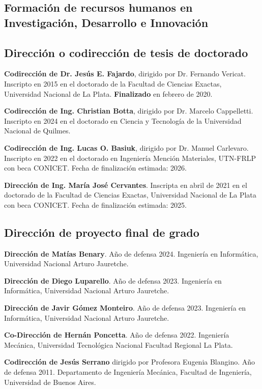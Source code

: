 \documentclass[margin,line]{res}
\begin{document}
\begin{resume}
\section{ Formación de recursos humanos en Investigación, Desarrollo e Innovación}
\vspace*{-.2in}
\subsection{ Dirección o codirección de tesis de doctorado}

{\bf Codirección de Dr. Jesús E. Fajardo}, dirigido por Dr. Fernando Vericat. Inscripto en 2015 en el doctorado de la Facultad de Ciencias Exactas, Universidad Nacional de La Plata. {\bf Finalizado} en febrero de 2020.

{\bf Codirección de Ing. Christian Botta}, dirigido por Dr. Marcelo Cappelletti. Inscripto en 2024 en el doctorado en Ciencia y Tecnología de la Universidad Nacional de Quilmes.

{\bf Codirección de Ing. Lucas O. Basiuk}, dirigido por Dr. Manuel Carlevaro. Inscripto en 2022 en el doctorado en Ingeniería Mención Materiales, UTN-FRLP con beca CONICET. Fecha de finalización estimada: 2026.

{\bf Dirección de Ing. María José Cervantes}. Inscripta en abril de 2021 en el doctorado de la Facultad de Ciencias Exactas, Universidad Nacional de La Plata con beca CONICET. Fecha de finalización estimada: 2025.

\subsection{ Dirección de proyecto final de grado}

{\bf Dirección de Matías Benary}. Año de defensa 2024. Ingeniería en Informática, Universidad Nacional Arturo Jauretche.

{\bf Dirección de Diego Luparello}. Año de defensa 2023. Ingeniería en Informática, Universidad Nacional Arturo Jauretche.

{\bf Dirección de Javir Gómez Monteiro}. Año de defensa 2023. Ingeniería en Informática, Universidad Nacional Arturo Jauretche.

{\bf Co-Dirección de Hernán Poncetta}. Año de defensa 2022. Ingeniería Mecánica, Universidad Tecnológica Nacional Facultad Regional La Plata.

{\bf Codirección de Jesús Serrano} dirigido por Profesora Eugenia Blangino. Año de defensa 2011. Departamento de Ingeniería Mecánica, Facultad de Ingeniería, Universidad de Buenos Aires.


\end{resume}
\end{document}

